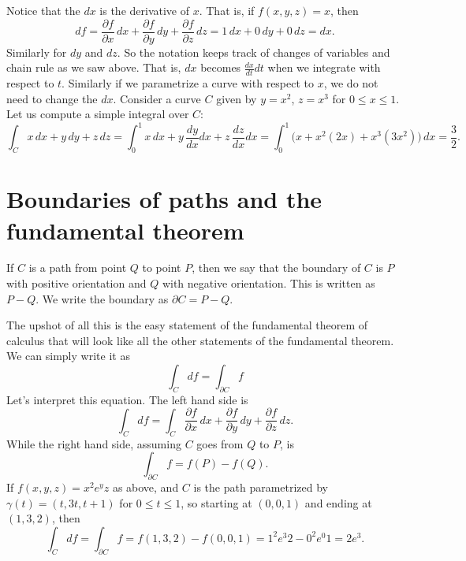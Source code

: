 \documentclass[12pt]{article}
\begin{document}
Notice that the $dx$ is the derivative of $x$.  That is, if $f(x,y,z) = x$, then
$$
df =
\frac{\partial f}{\partial x}\, dx + 
\frac{\partial f}{\partial y}\, dy + 
\frac{\partial f}{\partial z}\, dz =
1\, dx + 
0\, dy + 
0\, dz = dx .
$$
Similarly for $dy$ and $dz$.  So the notation keeps track of changes of
variables and chain rule as we saw above.  That is, $dx$ becomes
$\frac{dx}{dt} dt$ when we integrate with respect to $t$.  Similarly if we
parametrize a curve with respect to $x$, we do not need to change the $dx$.
Consider a curve $C$
given by $y=x^2$, $z=x^3$ for $0 \leq x \leq 1$.  Let us compute a
simple integral over $C$:
\begin{equation*}
\int_C x \, dx + y \, dy + z \, dz
=
\int_0^1 x \, dx + y \, \frac{dy}{dx} dx + z \, \frac{dz}{dx} dx
=
\int_0^1 \bigl( x + x^2 (2x) + x^3 (3x^2) \bigr) \, dx
=
\frac{3}{2} .
\end{equation*}

\section*{Boundaries of paths and the fundamental theorem}

If $C$ is a path from point $Q$ to point $P$, then we say that the boundary
of $C$ is $P$ with positive orientation and $Q$ with negative orientation.
This is written as $P-Q$.  We write the boundary as $\partial C = P-Q$.

The upshot of all this is the easy statement of the fundamental theorem
of calculus that will look like all the other statements of the fundamental
theorem.  We can simply write it as
\[
\int_C df = \int_{\partial C} f
\]
Let's interpret this equation.  The left hand side is
\[
\int_C df = \int_C \frac{\partial f}{\partial x}\, dx + 
\frac{\partial f}{\partial y}\, dy + 
\frac{\partial f}{\partial z}\, dz .
\]
While the right hand side, assuming $C$ goes from $Q$ to $P$, is
\[
\int_{\partial C} f = f(P) - f(Q) .
\]
If $f(x,y,z) = 
x^2e^yz$ as above, and $C$ is the path parametrized by
$\gamma(t) = (t,3t,t+1)$ for $0 \leq t \leq 1$, so starting at $(0,0,1)$ and ending
at $(1,3,2)$, then
\[
\int_C df = \int_{\partial C} f = f(1,3,2)-f(0,0,1) = 1^2 e^3 2 - 0^2e^0 1 =
2e^3.
\]
\end{document}
